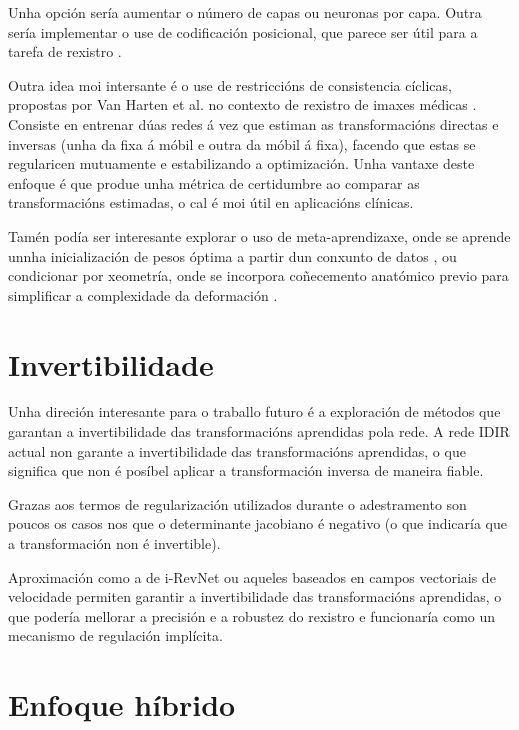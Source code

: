 Unha opción sería aumentar o número de capas ou neuronas por capa. Outra sería implementar o use de codificación posicional, que parece ser útil para a tarefa de rexistro \cite{mueller2022instant}.

Outra idea moi intersante é o use de restriccións de consistencia cíclicas, propostas por Van Harten et al. no contexto de rexistro de imaxes médicas \cite{van_Harten_2024}. Consiste en entrenar dúas redes á vez que estiman as transformacións directas e inversas (unha da fixa á móbil e outra da móbil á fixa), facendo que estas se regularicen mutuamente e estabilizando a optimización.
Unha vantaxe deste enfoque é que produe unha métrica de certidumbre ao comparar as transformacións estimadas, o cal é moi útil en aplicacións clínicas.

Tamén podía ser interesante explorar o uso de meta-aprendizaxe, onde se aprende unnha inicialización de pesos óptima a partir dun conxunto de datos \cite{learnedinit}, ou condicionar por xeometría, onde se incorpora coñecemento anatómico previo para simplificar a complexidade da deformación \cite{harten2023deformable}.  

\section{Invertibilidade}
\label{sec:Invertibilidade}

Unha direción interesante para o traballo futuro é a exploración de métodos que garantan a invertibilidade das transformacións aprendidas pola rede.
A rede IDIR actual non garante a invertibilidade das transformacións aprendidas, o que significa que non é posíbel aplicar a transformación inversa de maneira fiable.

Grazas aos termos de regularización utilizados durante o adestramento son poucos os casos nos que o determinante jacobiano é negativo (o que indicaría que a transformación non é invertible).

Aproximación como a de i-RevNet \cite{jacobsen2018irevnetdeepinvertiblenetworks} ou aqueles baseados en campos vectoriais de velocidade \cite{sun2024medicalimageregistrationneural} permiten garantir a invertibilidade das transformacións aprendidas, o que podería mellorar a precisión e a robustez do rexistro e funcionaría como un mecanismo de regulación implícita.

\section{Enfoque híbrido}
\label{sec:Enfoque híbrido}

